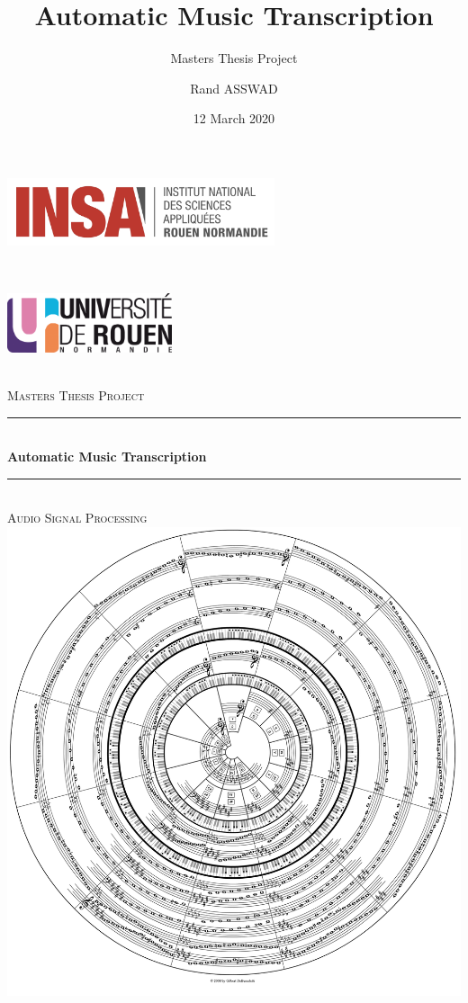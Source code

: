 \documentclass[american,]{article}
\title{Automatic Music Transcription}
\subtitle{Masters Thesis Project}
\author{Rand ASSWAD}
\date{12 March 2020}
\newcommand{\HRule}{\rule{\linewidth}{0.5mm}}
\begin{document}
\maketitle

\begin{titlepage}
    \begin{sffamily}
        \begin{center}
            \begin{minipage}[c]{0.45\textwidth}
            \raggedright\includegraphics[height=2cm]{img/logo_insa.png}
            \end{minipage}~\hfill~%
            \begin{minipage}[c]{0.45\textwidth}
            \raggedleft\includegraphics[height=1.75cm]{img/logo_univ.png}
            \end{minipage}\\[2cm]

            \textsc{\huge Masters Thesis Project}\\[1cm]

            \HRule \\[0.4cm]
            {\huge \bfseries Automatic Music Transcription \\[0.4cm]}
            \HRule \\[1cm]
            
            \textsc{\huge Audio Signal Processing}\\[1cm]

            \includegraphics[width=.6\textwidth]{img/cover_img.png}~\\[2cm]


\end{center}
\end{sffamily}
\end{titlepage}
\end{document}
